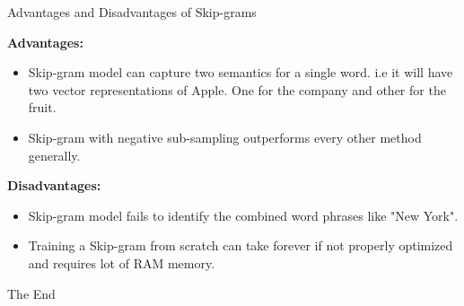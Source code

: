 \documentclass{beamer}
\newcommand\myheading[1]{%
  \par\bigskip
  {\Large\bfseries#1}\par\smallskip}
\begin{document}
\begin{frame}{Advantages and Disadvantages of Skip-grams}
	\begin{flushleft}
\myheading{Advantages:}
	\begin{itemize}
	\item Skip-gram model can capture two semantics for a single word. i.e it will have two vector representations of Apple. One for the company and other for the fruit.
	\item Skip-gram with negative sub-sampling outperforms every other method generally.
	\end{itemize}
\myheading{Disadvantages:}
	\begin{itemize}
	\item Skip-gram model fails to identify the combined word phrases like "New York".
	\item Training a Skip-gram from scratch can take forever if not properly optimized and requires lot of RAM memory.
	\end{itemize}
\end{flushleft}
\end{frame}
\begin{frame}
\huge{\centerline{The End}}
\end{frame}
\end{document}
